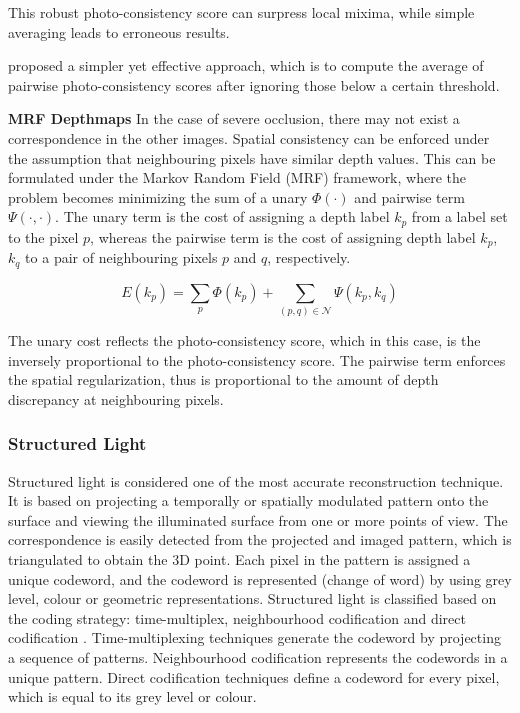 This robust photo-consistency score can surpress local mixima, while simple averaging leads to erroneous results.


\citeauthor{goesele2006multi} proposed a simpler yet effective approach, which is to compute the average of pairwise photo-consistency scores after ignoring those below a certain threshold.

\textbf{MRF Depthmaps} In the case of severe occlusion, there may not exist a correspondence in the other images. Spatial consistency can be enforced under the assumption that neighbouring pixels have similar depth values. This can be formulated under the Markov Random Field (MRF) framework, where the problem becomes minimizing the sum of a unary $\Phi(\cdot)$ and pairwise term $\Psi(\cdot, \cdot)$. The unary term is the cost of assigning a depth label $k_p$ from a label set to the pixel $p$, whereas the pairwise term is the cost of assigning depth label $k_p$, $k_q$ to a pair of neighbouring pixels $p$ and $q$, respectively.

\begin{equation}
E(k_p)= \sum_p \Phi(k_p) + \sum_{(p,q)\in\mathcal{N}}\Psi(k_p, k_q)
\end{equation}

The unary cost reflects the photo-consistency score, which in this case, is the inversely proportional to the photo-consistency score. The pairwise term enforces the spatial regularization, thus is proportional to the amount of depth discrepancy at neighbouring pixels. 

\subsubsection{Structured Light}
Structured light is considered one of the most accurate reconstruction technique. It is based on projecting a temporally or spatially modulated pattern onto the surface and viewing the illuminated surface from one or more points of view. The correspondence is easily detected from the projected and imaged pattern, which is triangulated to obtain the 3D point. Each pixel in the pattern is assigned a unique codeword, and the codeword is represented (change of word) by using grey level, colour or geometric representations. Structured light is classified based on the coding strategy: time-multiplex, neighbourhood codification and direct codification \cite{salvi2004pattern}. Time-multiplexing techniques generate the codeword by projecting a sequence of patterns. Neighbourhood codification represents the codewords in a unique pattern. Direct codification techniques define a codeword for every pixel, which is equal to its grey level or colour.

